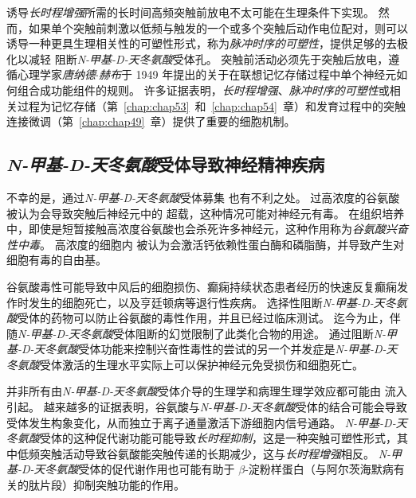 诱导\textit{长时程增强}所需的长时间高频突触前放电不太可能在生理条件下实现。
然而，如果单个突触前刺激以低频与触发的一个或多个突触后动作电位配对，则可以诱导一种更具生理相关性的可塑性形式，称为\textit{脉冲时序的可塑性}，提供足够的去极化以减轻  阻断\textit{N-甲基-D-天冬氨酸}受体孔。
突触前活动必须先于突触后放电，遵循心理学家\textit{唐纳德$\cdot$赫布}于 1949 年提出的关于在联想记忆存储过程中单个神经元如何组合成功能组件的规则。
许多证据表明，\textit{长时程增强}、\textit{脉冲时序的可塑性}或相关过程为记忆存储（第~\ref{chap:chap53}~和~\ref{chap:chap54}~章）和发育过程中的突触连接微调（第~\ref{chap:chap49}~章）提供了重要的细胞机制。



\subsection{\textit{N-甲基-D-天冬氨酸}受体导致神经精神疾病}

不幸的是，通过\textit{N-甲基-D-天冬氨酸}受体募集  也有不利之处。
过高浓度的谷氨酸被认为会导致突触后神经元中的  超载，这种情况可能对神经元有毒。
在组织培养中，即使是短暂接触高浓度谷氨酸也会杀死许多神经元，这种作用称为\textit{谷氨酸兴奋性中毒}。
高浓度的细胞内  被认为会激活钙依赖性蛋白酶和磷脂酶，并导致产生对细胞有毒的自由基。


谷氨酸毒性可能导致中风后的细胞损伤、癫痫持续状态患者经历的快速反复癫痫发作时发生的细胞死亡，以及亨廷顿病等退行性疾病。
选择性阻断\textit{N-甲基-D-天冬氨酸}受体的药物可以防止谷氨酸的毒性作用，并且已经过临床测试。
迄今为止，伴随\textit{N-甲基-D-天冬氨酸}受体阻断的幻觉限制了此类化合物的用途。
通过阻断\textit{N-甲基-D-天冬氨酸}受体功能来控制兴奋性毒性的尝试的另一个并发症是\textit{N-甲基-D-天冬氨酸}受体激活的生理水平实际上可以保护神经元免受损伤和细胞死亡。


并非所有由\textit{N-甲基-D-天冬氨酸}受体介导的生理学和病理生理学效应都可能由  流入引起。
越来越多的证据表明，谷氨酸与\textit{N-甲基-D-天冬氨酸}受体的结合可能会导致受体发生构象变化，从而独立于离子通量激活下游细胞内信号通路。 
\textit{N-甲基-D-天冬氨酸}受体的这种促代谢功能可能导致\textit{长时程抑制}，这是一种突触可塑性形式，其中低频突触活动导致谷氨酸能突触传递的长期减少，这与\textit{长时程增强}相反。
\textit{N-甲基-D-天冬氨酸}受体的促代谢作用也可能有助于 $\beta$-淀粉样蛋白（与阿尔茨海默病有关的肽片段）抑制突触功能的作用。



